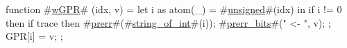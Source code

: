 function #\hyperref[zwGPR]{wGPR}# (idx, v) = {
  let i as atom(_) = #\hyperref[zunsigned]{unsigned}#(idx) in
  if i != 0 then {
    if trace then {
      #\hyperref[zprerr]{prerr}#(#\hyperref[zstringzyofzyint]{string\_of\_int}#(i));
      #\hyperref[zprerrzybits]{prerr\_bits}#(" <- ", v);
    };
    GPR[i] = v;
  };
}
